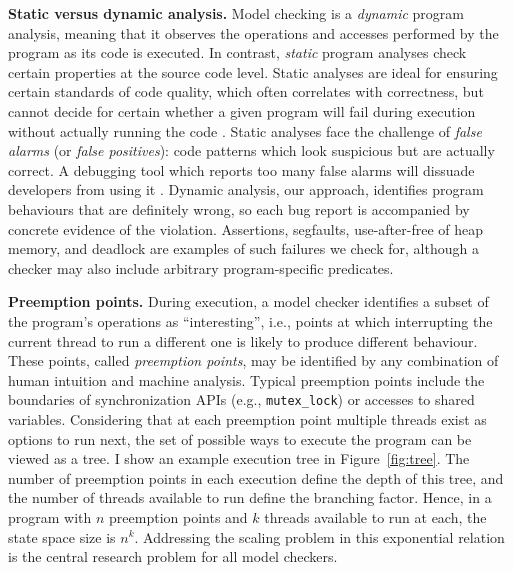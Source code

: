 {\bf Static versus dynamic analysis.}
Model checking is a {\em dynamic} program analysis, meaning that it observes the operations and accesses performed by the program as its code is executed.
In contrast, {\em static} program analyses check certain properties at the source code level.
Static analyses are ideal for ensuring certain standards of code quality, which often correlates with correctness,
but cannot decide for certain whether a given program will fail during execution without actually running the code \cite{incompleteness}.
Static analyses face the challenge of {\em false alarms} (or {\em false positives}):
code patterns which look suspicious but are actually correct.
A debugging tool which reports too many false alarms will dissuade developers from using it \cite{racerx}.
Dynamic analysis, our approach, identifies program behaviours that are definitely wrong,
so each bug report is accompanied by concrete evidence of the violation.
Assertions, segfaults, use-after-free of heap memory, and deadlock are examples of such failures we check for,
although a checker may also include arbitrary program-specific predicates.

{\bf Preemption points.}
During execution, a model checker identifies a subset of the program's operations as ``interesting'', i.e.,
points at which interrupting the current thread to run a different one is likely to produce different behaviour.
These points, called {\em preemption points}, may be identified by any combination of human intuition and machine analysis.
Typical preemption points include the boundaries of synchronization APIs (e.g., {\tt mutex\_lock}) or accesses to shared variables.
Considering that at each preemption point multiple threads exist as options to run next, the set of possible ways to execute the program can be viewed as a tree.
I show an example execution tree in Figure~\ref{fig:tree}.
The number of preemption points in each execution define the depth of this tree, and the number of threads available to run define the branching factor.
Hence, in a program with $n$ preemption points and $k$ threads available to run at each, the state space size is $n^k$.
Addressing the scaling problem in this exponential relation is the central research problem for all model checkers.

